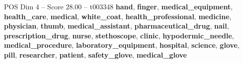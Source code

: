 \begin{textsample}{POS Dim 4 – Score 28.00 – t003348}  \label{ex:f4_pos_033}
\textbf{hand}, \textbf{finger}, \textbf{medical\_equipment}, \textbf{health\_care}, \textbf{medical}, \textbf{white\_coat}, \textbf{health\_professional}, \textbf{medicine}, \textbf{physician}, \textbf{thumb}, \textbf{medical\_assistant}, \textbf{pharmaceutical\_drug}, \textbf{nail}, \textbf{prescription\_drug}, \textbf{nurse}, \textbf{stethoscope}, \textbf{clinic}, \textbf{hypodermic\_needle}, \textbf{medical\_procedure}, \textbf{laboratory\_equipment}, \textbf{hospital}, \textbf{science}, \textbf{glove}, \textbf{pill}, \textbf{researcher}, \textbf{patient}, \textbf{safety\_glove}, \textbf{medical\_glove}

\end{textsample}
